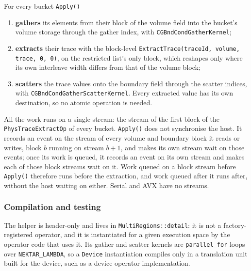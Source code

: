 For every bucket \texttt{Apply()}
\begin{enumerate}
  \item \textbf{gathers} its elements from their block of the volume field
    into the bucket's volume storage through the gather index, with
    \texttt{CGBndCondGatherKernel};
  \item \textbf{extracts} their trace with the block-level
    \texttt{ExtractTrace(traceId, volume, trace, 0, 0)}, on the restricted
    list's only block, which reshapes only where its own interleave width
    differs from that of the volume block;
  \item \textbf{scatters} the trace values onto the boundary field through
    the scatter indices, with \texttt{CGBndCondGatherScatterKernel}. Every
    extracted value has its own destination, so no atomic operation is
    needed.
\end{enumerate}
All the work runs on a single stream: the stream of the first block of the
\texttt{PhysTraceExtractOp} of every bucket. \texttt{Apply()} does not
synchronise the host. It records an event on the stream of every volume and
boundary block it reads or writes, block $b$ running on stream $b + 1$, and
makes its own stream wait on those events; once its work is queued, it
records an event on its own stream and makes each of those block streams
wait on it. Work queued on a block stream before \texttt{Apply()} therefore
runs before the extraction, and work queued after it runs after, without the
host waiting on either. Serial and AVX have no streams.

\subsubsection*{Compilation and testing}

The helper is header-only and lives in \texttt{MultiRegions::detail}: it is
not a factory-registered operator, and it is instantiated for a given
execution space by the operator code that uses it. Its gather and scatter
kernels are \texttt{parallel\_for} loops over \texttt{NEKTAR\_LAMBDA}, so a
\texttt{Device} instantiation compiles only in a translation unit built for
the device, such as a device operator implementation.

